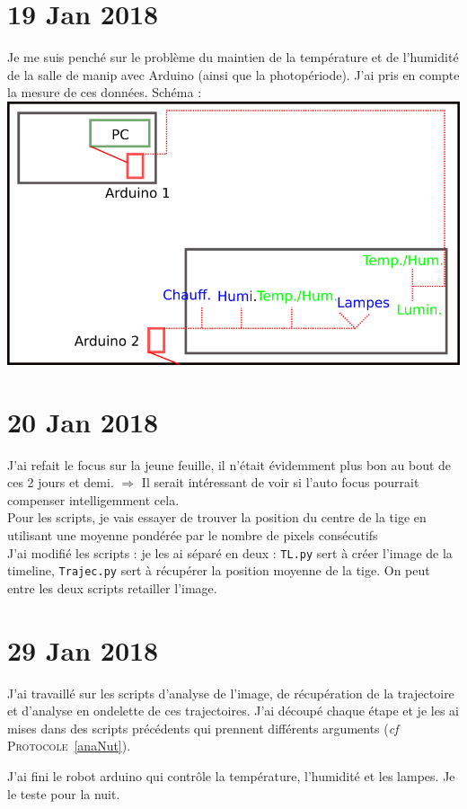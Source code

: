 \documentclass[10pt,a4paper]{article}
\begin{document}
\section{19 Jan 2018}
Je me suis penché sur le problème du maintien de la température et de l'humidité de la salle de manip avec Arduino (ainsi que la photopériode). J'ai pris en compte la mesure de ces données. Schéma :\\
\includegraphics[width=0.6\linewidth]{schema_Arduino.png}

\section{20 Jan 2018}
J'ai refait le focus sur la jeune feuille, il n'était évidemment plus bon au bout de ces 2 jours et demi. $\Rightarrow$ Il serait intéressant de voir si l'auto focus pourrait compenser intelligemment cela.\\

Pour les scripts, je vais essayer de trouver la position du centre de la tige en utilisant une moyenne pondérée par le nombre de pixels consécutifs\\

J'ai modifié les scripts : je les ai séparé en deux : \texttt{TL.py} sert à créer l'image de la timeline, \texttt{Trajec.py} sert à récupérer la position moyenne de la tige. On peut entre les deux scripts retailler l'image.

\section{29 Jan 2018}
J'ai travaillé sur les scripts d'analyse de l'image, de récupération de la trajectoire et d'analyse en ondelette de ces trajectoires. J'ai découpé chaque étape et je les ai mises dans des scripts précédents qui prennent différents arguments (\textit{cf} \textsc{Protocole}~\ref{anaNut}).

J'ai fini le robot arduino qui contrôle la température, l'humidité et les lampes. Je le teste pour la nuit.
\end{document}
